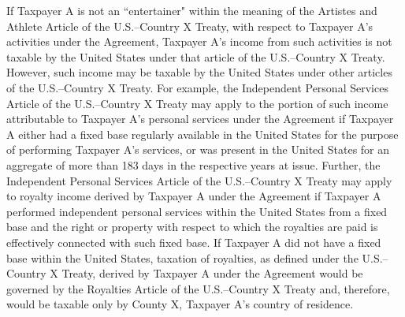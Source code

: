 \begin{select}
If Taxpayer A is not an ``entertainer" within the meaning of the Artistes and
Athlete Article of the U.S.--Country X Treaty, with respect to Taxpayer A's activities 
under the Agreement, Taxpayer A's income from such activities is not taxable by
the United States under that article of the U.S.--Country X Treaty. However, such
income may be taxable by the United States under other articles of the U.S.--Country X Treaty. For example, the Independent Personal Services Article of the
U.S.--Country X Treaty may apply to the portion of such income attributable to
Taxpayer A's personal services under the Agreement if Taxpayer A either had a
fixed base regularly available in the United States for the purpose of performing
Taxpayer A's services, or was present in the United States for an aggregate of
more than 183 days in the respective years at issue. Further, the Independent
Personal Services Article of the U.S.--Country X Treaty may apply to royalty income
derived by Taxpayer A under the Agreement if Taxpayer A performed independent
personal services within the United States from a fixed base and the right or
property with respect to which the royalties are paid is effectively connected with
such fixed base. If Taxpayer A did not have a fixed base within the United States,
taxation of royalties, as defined under the U.S.--Country X Treaty, derived by
Taxpayer A under the Agreement would be governed by the Royalties Article of the
U.S.--Country X Treaty and, therefore, would be taxable only by County X, Taxpayer
A’s country of residence.

\end{select}

